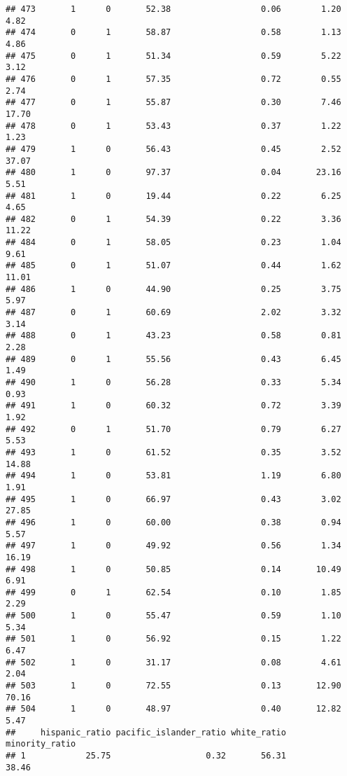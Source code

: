 \documentclass[
]{article}
\begin{document}
\begin{verbatim}
## 473       1      0       52.38                  0.06        1.20        4.82
## 474       0      1       58.87                  0.58        1.13        4.86
## 475       0      1       51.34                  0.59        5.22        3.12
## 476       0      1       57.35                  0.72        0.55        2.74
## 477       0      1       55.87                  0.30        7.46       17.70
## 478       0      1       53.43                  0.37        1.22        1.23
## 479       1      0       56.43                  0.45        2.52       37.07
## 480       1      0       97.37                  0.04       23.16        5.51
## 481       1      0       19.44                  0.22        6.25        4.65
## 482       0      1       54.39                  0.22        3.36       11.22
## 484       0      1       58.05                  0.23        1.04        9.61
## 485       0      1       51.07                  0.44        1.62       11.01
## 486       1      0       44.90                  0.25        3.75        5.97
## 487       0      1       60.69                  2.02        3.32        3.14
## 488       0      1       43.23                  0.58        0.81        2.28
## 489       0      1       55.56                  0.43        6.45        1.49
## 490       1      0       56.28                  0.33        5.34        0.93
## 491       1      0       60.32                  0.72        3.39        1.92
## 492       0      1       51.70                  0.79        6.27        5.53
## 493       1      0       61.52                  0.35        3.52       14.88
## 494       1      0       53.81                  1.19        6.80        1.91
## 495       1      0       66.97                  0.43        3.02       27.85
## 496       1      0       60.00                  0.38        0.94        5.57
## 497       1      0       49.92                  0.56        1.34       16.19
## 498       1      0       50.85                  0.14       10.49        6.91
## 499       0      1       62.54                  0.10        1.85        2.29
## 500       1      0       55.47                  0.59        1.10        5.34
## 501       1      0       56.92                  0.15        1.22        6.47
## 502       1      0       31.17                  0.08        4.61        2.04
## 503       1      0       72.55                  0.13       12.90       70.16
## 504       1      0       48.97                  0.40       12.82        5.47
##     hispanic_ratio pacific_islander_ratio white_ratio minority_ratio
## 1            25.75                   0.32       56.31          38.46

\end{verbatim}
\end{document}
